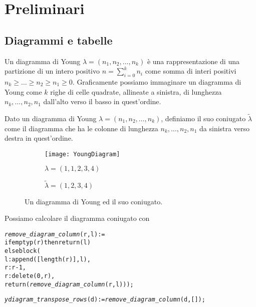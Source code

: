 \chapter{Preliminari}

\section{Diagrammi e tabelle}

\begin{defn}
Un diagramma di Young $\lambda=(n_1,n_2,\dots,n_k)$ \`e una
rappresentazione di una partizione di un intero positivo $n =
\sum_{i=0}^{k}{n_i}$ come somma di interi positivi $n_k \geq \ldots \geq
n_2 \geq n_1 \geq 0$. Graficamente possiamo immaginare un diagramma di
Young come $k$ righe di celle quadrate, allineate a sinistra, di
lunghezza $n_k,\ldots,n_2,n_1$ dall'alto verso il basso in quest'ordine.
\end{defn}

\begin{defn}
Dato un diagramma di Young $\lambda=(n_1,n_2,\dots,n_k)$, definiamo il
suo coniugato $\tilde{\lambda}$ come il diagramma che ha le colonne di
lunghezza $n_k,\ldots,n_2,n_1$ da sinistra verso destra in quest'ordine.  
\end{defn}

\begin{figure}[h]
\centering

\begin{subfigure}[b]{0.4\textwidth}
\centering
\texttt{[image: YoungDiagram]}
\caption{$\lambda=(1,1,2,3,4)$}
\end{subfigure}%
\begin{subfigure}[b]{0.4\textwidth}
\centering
{}
\caption{$\tilde{\lambda}=(1,2,3,4)$}
\end{subfigure}
\caption{Un diagramma di Young ed il suo coniugato.}
\end{figure}

Possiamo calcolare il diagramma coniugato con

\begin{alltt}
\emph{remove\_diagram\_column} (r, l) := 
if emptyp (r) then return (l)
else block (
  l : append ([length (r)], l),
  r : r-1,
  r : delete (0, r),
  return (\emph{remove\_diagram\_column} (r, l)));

\emph{ydiagram\_transpose\_rows} (d) := \emph{remove\_diagram\_column} (d, []);
\end{alltt}

